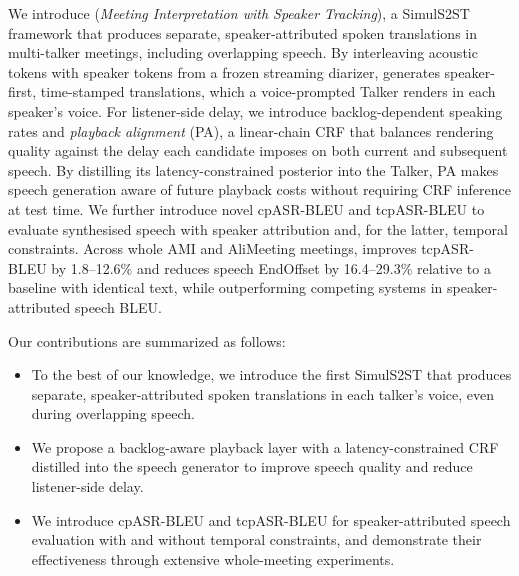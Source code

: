 We introduce \sys{} (\emph{Meeting Interpretation with Speaker Tracking}), a SimulS2ST framework that produces separate, speaker-attributed spoken translations in multi-talker meetings, including overlapping speech. By interleaving acoustic tokens with speaker tokens from a frozen streaming diarizer, \sys{} generates speaker-first, time-stamped translations, which a voice-prompted Talker renders in each speaker's voice. For listener-side delay, we introduce backlog-dependent speaking rates and \emph{playback alignment} (PA), a linear-chain CRF that balances rendering quality against the delay each candidate imposes on both current and subsequent speech. By distilling its latency-constrained posterior into the Talker, PA makes speech generation aware of future playback costs without requiring CRF inference at test time. We further introduce novel cpASR-BLEU and tcpASR-BLEU to evaluate synthesised speech with speaker attribution and, for the latter, temporal constraints. Across whole AMI and AliMeeting meetings, \sys{} improves tcpASR-BLEU by 1.8--12.6\% and reduces speech EndOffset by 16.4--29.3\% relative to a baseline with identical text, while outperforming competing systems in speaker-attributed speech BLEU.

Our contributions are summarized as follows:
\begin{itemize}
    \item To the best of our knowledge, we introduce the first SimulS2ST that produces separate, speaker-attributed spoken translations in each talker's voice, even during overlapping speech.
    \item We propose a backlog-aware playback layer with a latency-constrained CRF distilled into the speech generator to improve speech quality and reduce listener-side delay.
    \item We introduce cpASR-BLEU and tcpASR-BLEU for speaker-attributed speech evaluation with and without temporal constraints, and demonstrate their effectiveness through extensive whole-meeting experiments.
\end{itemize}

